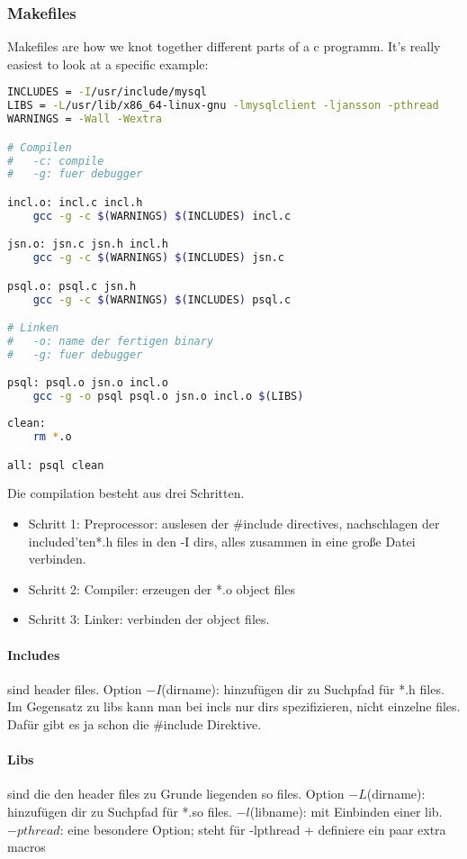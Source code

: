 \subsubsection{Makefiles}

Makefiles are how we knot together different parts of a c programm. It's really easiest to look at a specific example:

\begin{lstlisting}[language=bash]
INCLUDES = -I/usr/include/mysql
LIBS = -L/usr/lib/x86_64-linux-gnu -lmysqlclient -ljansson -pthread
WARNINGS = -Wall -Wextra

# Compilen
#   -c: compile
#   -g: fuer debugger

incl.o: incl.c incl.h
	gcc -g -c $(WARNINGS) $(INCLUDES) incl.c

jsn.o: jsn.c jsn.h incl.h
	gcc -g -c $(WARNINGS) $(INCLUDES) jsn.c

psql.o: psql.c jsn.h
	gcc -g -c $(WARNINGS) $(INCLUDES) psql.c

# Linken
# 	-o: name der fertigen binary
# 	-g: fuer debugger

psql: psql.o jsn.o incl.o
	gcc -g -o psql psql.o jsn.o incl.o $(LIBS)
	
clean: 
    rm *.o

all: psql clean
\end{lstlisting}

Die compilation besteht aus drei Schritten.

\begin{itemize}
    \item Schritt 1: Preprocessor: auslesen der \#include directives, nachschlagen der included'ten*.h files in den -I dirs, alles zusammen in eine große Datei verbinden.
    \item Schritt 2: Compiler: erzeugen der *.o object files
    \item Schritt 3: Linker:  verbinden der object files.
\end{itemize}
 
\paragraph{Includes} sind header files.
Option $-I$(dirname): hinzufügen dir zu Suchpfad für *.h files.
Im Gegensatz zu libs kann man bei incls nur dirs spezifizieren, nicht einzelne files. Dafür gibt es ja schon die \#include Direktive.

\paragraph{Libs} sind die den header files zu Grunde liegenden so files.
Option $-L$(dirname): hinzufügen dir zu Suchpfad für *.so files.
 	$-l$(libname): mit Einbinden einer lib.
 	$-pthread$: eine besondere Option; steht für -lpthread + definiere ein paar extra macros

